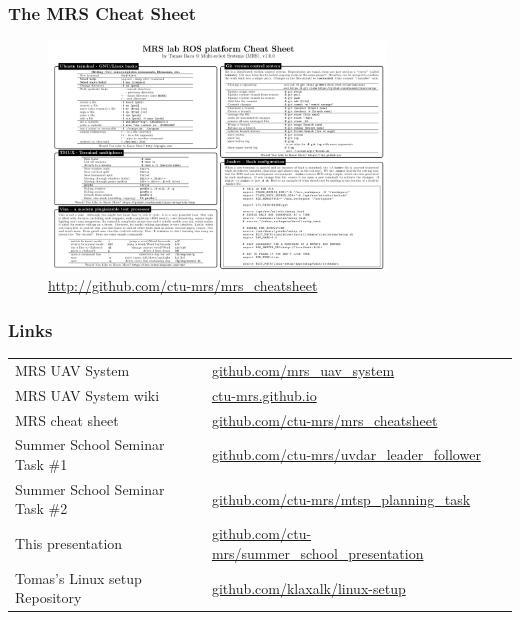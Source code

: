 \documentclass[aspectratio=1610]{beamer}
\begin{document}


  \begin{frame}
    \frametitle{The MRS Cheat Sheet}
    \vspace{-1.0em}
    \begin{figure}
      \caption*{\url{http://github.com/ctu-mrs/mrs_cheatsheet}}
      \vspace{-0.5em}
      \includegraphics[width=0.8\textwidth]{./fig/mrs_cheatsheet.png}
    \end{figure}

  \end{frame}


  \begin{frame}
    \frametitle{Links}

    \begin{tabular}{ll}

      MRS UAV System & {\small \url{github.com/mrs_uav_system}}\\
      MRS UAV System wiki                       & {\small \url{ctu-mrs.github.io}}\\
      MRS cheat sheet                & {\small \url{github.com/ctu-mrs/mrs_cheatsheet}}\\
      Summer School Seminar Task \#1 & {\small \url{github.com/ctu-mrs/uvdar_leader_follower}}\\
      Summer School Seminar Task \#2 & {\small \url{github.com/ctu-mrs/mtsp_planning_task}}\\
      This presentation              & {\small \url{github.com/ctu-mrs/summer_school_presentation}}\\
      Tomas's Linux setup Repository & {\small \url{github.com/klaxalk/linux-setup}}\\
    \end{tabular}

  \end{frame}
\end{document}
